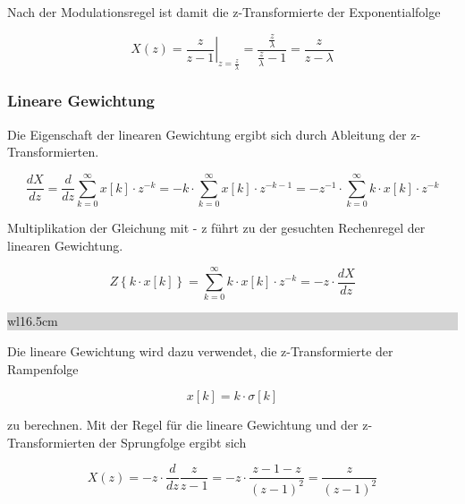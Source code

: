 \noindent Nach der Modulationsregel ist damit die z-Transformierte der Exponentialfolge

\begin{equation}\label{eq:fivefiftythree}
X\left(z\right)=\left. \frac{z}{z-1} \right|_{z=\frac{z}{\lambda } } =\frac{\frac{z}{\lambda } }{\frac{z}{\lambda } -1} =\frac{z}{z-\lambda }
\end{equation}

\subsubsection{Lineare Gewichtung}

\noindent Die Eigenschaft der linearen Gewichtung ergibt sich durch Ableitung der z-Transformierten.

\begin{equation}\label{eq:fivefiftyfour}
\frac{dX}{dz} =\frac{d}{dz} \sum _{k=0}^{\infty }x\left[k\right]\cdot z^{-k}  =-k\cdot \sum _{k=0}^{\infty }x\left[k\right]\cdot z^{-k-1}  =-z^{-1} \cdot \sum _{k=0}^{\infty }k\cdot x\left[k\right]\cdot z^{-k}
\end{equation}

\noindent Multiplikation der Gleichung mit - z f\"{u}hrt zu der gesuchten Rechenregel der linearen Gewichtung. 

\begin{equation}\label{eq:fivefiftyfive}
Z\left\{k\cdot x\left[k\right]\right\}=\sum _{k=0}^{\infty }k\cdot x\left[k\right]\cdot z^{-k}  =-z\cdot \frac{dX}{dz}
\end{equation}

\clearpage

\noindent
\colorbox{lightgray}{%
%
\renewcommand\arraystretch{0.6}%
\begin{tabular}{ wl{16.5cm} }
{\selectfont{Beispiel: Gewichtung}}
\end{tabular}%
}\medskip

\noindent Die lineare Gewichtung wird dazu verwendet, die z-Transformierte der Rampenfolge 

\begin{equation}\label{eq:fivefiftysix}
x\left[k\right]=k\cdot \sigma \left[k\right]
\end{equation}

\noindent zu berechnen. Mit der Regel f\"{u}r die lineare Gewichtung und der z-Transformierten der Sprungfolge ergibt sich

\begin{equation}\label{eq:fivefiftyseven}
X\left(z\right)=-z\cdot \frac{d}{dz} \frac{z}{z-1} =-z\cdot \frac{z-1-z}{\left(z-1\right)^{2} } =\frac{z}{\left(z-1\right)^{2}} 
\end{equation}

